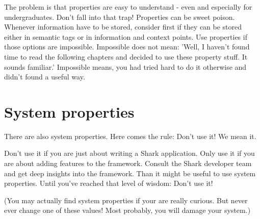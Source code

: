 The problem is that properties are easy to understand - even and especially for undergraduates. Don't fall into that trap! Properties can be sweet poison. Whenever information have to be stored, consider first if they can be stored either in semantic tags or in information and context points. Use properties if those options are impossible. Impossible does not mean: 'Well, I haven't found time to read the following chapters and decided to use these property stuff. It sounds familiar.' Impossible means, you had tried hard to do it otherwise and didn't found a useful way.

\section{System properties}
There are also system properties. Here comes the rule: Don't use it! We mean it. 

Don't use it if you are just about writing a Shark application. Only use it if you are about adding features to the framework. Consult the Shark developer team and get deep insights into the framework. Than it might be useful to use system properties. Until you've reached that level of wisdom: Don't use it!

(You may actually find system properties if your are really curious. But never ever change one of these values! Most probably, you will damage your system.)
        
